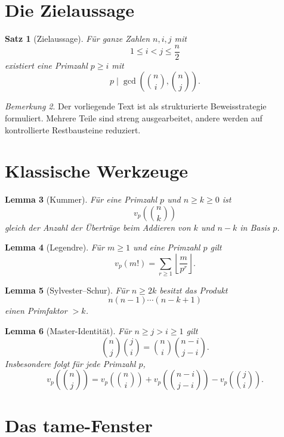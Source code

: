 \documentclass[12pt,a4paper]{article}
\theoremstyle{plain}
\newtheorem{theorem}{Satz}[section]
\newtheorem{lemma}[theorem]{Lemma}
\theoremstyle{definition}
\theoremstyle{remark}
\newtheorem{remark}[theorem]{Bemerkung}
\begin{document}
	\section{Die Zielaussage}
	
	\begin{theorem}[Zielaussage]
		\label{thm:target}
		Für ganze Zahlen \(n,i,j\) mit
		\[
		1\le i<j\le \frac n2
		\]
		existiert eine Primzahl \(p\ge i\) mit
		\[
		p\mid \gcd\!\left(\binom ni,\binom nj\right).
		\]
	\end{theorem}
	
	\begin{remark}
		Der vorliegende Text ist als strukturierte Beweisstrategie formuliert. Mehrere Teile sind streng ausgearbeitet, andere werden auf kontrollierte Restbausteine reduziert.
	\end{remark}
	
	\section{Klassische Werkzeuge}
	
	\begin{lemma}[Kummer]
		Für eine Primzahl \(p\) und \(n\ge k\ge0\) ist
		\[
		v_p\!\left(\binom nk\right)
		\]
		gleich der Anzahl der Überträge beim Addieren von \(k\) und \(n-k\) in Basis \(p\).
	\end{lemma}
	
	\begin{lemma}[Legendre]
		Für \(m\ge1\) und eine Primzahl \(p\) gilt
		\[
		v_p(m!)=\sum_{r\ge1}\left\lfloor \frac{m}{p^r}\right\rfloor.
		\]
	\end{lemma}
	
	\begin{lemma}[Sylvester--Schur]
		\label{lem:sylvester-schur}
		Für \(n\ge 2k\) besitzt das Produkt
		\[
		n(n-1)\cdots(n-k+1)
		\]
		einen Primfaktor \(>k\).
	\end{lemma}
	
	\begin{lemma}[Master-Identität]
		\label{lem:master}
		Für \(n\ge j>i\ge1\) gilt
		\[
		\binom nj \binom ji
		=
		\binom ni \binom{n-i}{j-i}.
		\]
		Insbesondere folgt für jede Primzahl \(p\),
		\[
		v_p\!\left(\binom nj\right)
		=
		v_p\!\left(\binom ni\right)
		+
		v_p\!\left(\binom{n-i}{j-i}\right)
		-
		v_p\!\left(\binom ji\right).
		\]
	\end{lemma}
	
	\section{Das tame-Fenster}
	
\end{document}
